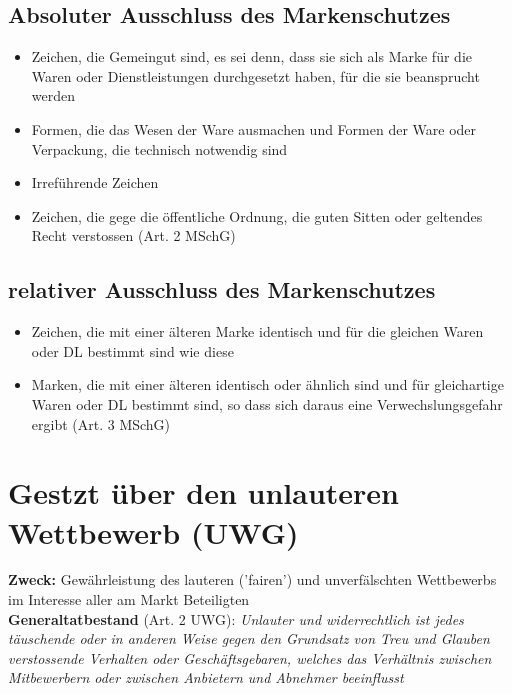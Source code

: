 \documentclass{report}
\theoremstyle{definition}
\theoremstyle{example}
\begin{document}
\subsection{Absoluter Ausschluss des Markenschutzes}
\begin{itemize}
   \item Zeichen, die Gemeingut sind, es sei denn, dass sie sich als Marke für die Waren oder Dienstleistungen durchgesetzt haben, für die sie beansprucht werden
   \item Formen, die das Wesen der Ware ausmachen und Formen der Ware oder Verpackung, die technisch notwendig sind
   \item Irreführende Zeichen
   \item Zeichen, die gege die öffentliche Ordnung, die guten Sitten oder geltendes Recht verstossen (Art. 2 MSchG)
\end{itemize}

\subsection{relativer Ausschluss des Markenschutzes}
\begin{itemize}
   \item Zeichen, die mit einer älteren Marke identisch und für die gleichen Waren oder DL bestimmt sind wie diese
   \item Marken, die mit einer älteren identisch oder ähnlich sind und für gleichartige Waren oder DL bestimmt sind, so dass sich daraus eine Verwechslungsgefahr ergibt (Art. 3 MSchG)
\end{itemize}

\section{Gestzt über den unlauteren Wettbewerb (UWG)}
\textbf{Zweck:} Gewährleistung des lauteren ('fairen') und unverfälschten Wettbewerbs im Interesse aller am Markt Beteiligten\\
\textbf{Generaltatbestand} (Art. 2 UWG): \textit{Unlauter und widerrechtlich ist jedes täuschende oder in anderen Weise gegen den Grundsatz von Treu und Glauben verstossende Verhalten oder Geschäftsgebaren, welches das Verhältnis zwischen Mitbewerbern oder zwischen Anbietern und Abnehmer beeinflusst}\\
\end{document}
